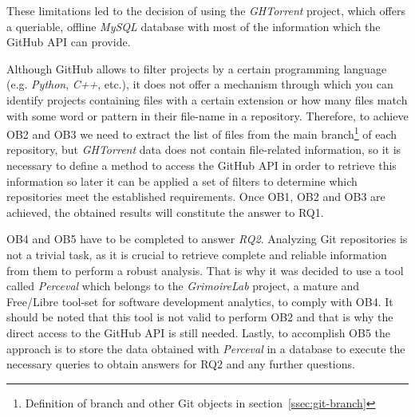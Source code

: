 \documentclass[a4paper, 12pt]{book}
\begin{document}
These limitations led to the decision of using the \emph{GHTorrent} project, which offers a queriable, offline \emph{MySQL}
database with most of the information which the GitHub API can provide.\par
Although GitHub allows to filter projects by a certain programming language (e.g. \emph{Python}, \emph{C++}, etc.),
it does not offer a mechanism through which you can identify projects containing files with a certain extension or how many files
match with some word or pattern in their file-name in a repository. Therefore, to achieve OB2 and OB3 we need to extract the list of files
from the main branch\footnote{Definition of branch and other Git objects in section~\ref{ssec:git-branch}} of each repository,
but \emph{GHTorrent} data does not contain file-related information, so it is necessary to define a method to access the GitHub API
in order to retrieve this information so later it can be applied a set of filters to determine which repositories meet the established
requirements. Once OB1, OB2 and OB3 are achieved, the obtained results will constitute the answer to RQ1.\par
OB4 and OB5 have to be completed to answer \emph{RQ2}. Analyzing Git repositories is not a trivial task, as it is crucial
to retrieve complete and reliable information from them to perform a robust analysis. That is why it was decided to
use a tool called \emph{Perceval} which belongs to the \emph{GrimoireLab} project, a mature and Free/Libre tool-set for software development
analytics, to comply with OB4. It should be noted that this tool is not valid to perform OB2 and that is why the direct access to the
GitHub API is still needed. Lastly, to accomplish OB5 the approach is to store the data obtained with \emph{Perceval} in a database to execute
the necessary queries to obtain answers for RQ2 and any further questions.
\cleardoublepage
\end{document}
